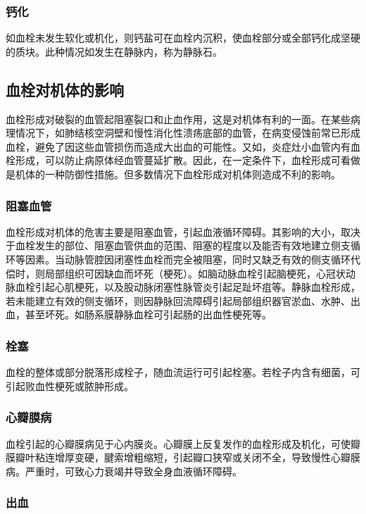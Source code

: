 \subsubsection{钙化}

如血栓未发生软化或机化，则钙盐可在血栓内沉积，使血栓部分或全部钙化成坚硬的质块。此种情况如发生在静脉内，称为静脉石。

\subsection{血栓对机体的影响}

血栓形成对破裂的血管起阻塞裂口和止血作用，这是对机体有利的一面。在某些病理情况下，如肺结核空洞壁和慢性消化性溃疡底部的血管，在病变侵蚀前常已形成血栓，避免了因这些血管损伤而造成大出血的可能性。又如，炎症灶小血管内有血栓形成，可以防止病原体经血管蔓延扩散。因此，在一定条件下，血栓形成可看做是机体的一种防御性措施。但多数情况下血栓形成对机体则造成不利的影响。

\subsubsection{阻塞血管}

血栓形成对机体的危害主要是阻塞血管，引起血液循环障碍。其影响的大小，取决于血栓发生的部位、阻塞血管供血的范围、阻塞的程度以及能否有效地建立侧支循环等因素。当动脉管腔因闭塞性血栓而完全被阻塞，同时又缺乏有效的侧支循环代偿时，则局部组织可因缺血而坏死（梗死）。如脑动脉血栓引起脑梗死，心冠状动脉血栓引起心肌梗死，以及股动脉闭塞性脉管炎引起足趾坏疽等。静脉血栓形成，若未能建立有效的侧支循环，则因静脉回流障碍引起局部组织器官淤血、水肿、出血，甚至坏死。如肠系膜静脉血栓可引起肠的出血性梗死等。

\subsubsection{栓塞}

血栓的整体或部分脱落形成栓子，随血流运行可引起栓塞。若栓子内含有细菌，可引起败血性梗死或脓肿形成。

\subsubsection{心瓣膜病}

血栓引起的心瓣膜病见于心内膜炎。心瓣膜上反复发作的血栓形成及机化，可使瓣膜瓣叶粘连增厚变硬，腱索增粗缩短，引起瓣口狭窄或关闭不全，导致慢性心瓣膜病。严重时，可致心力衰竭并导致全身血液循环障碍。

\subsubsection{出血}

